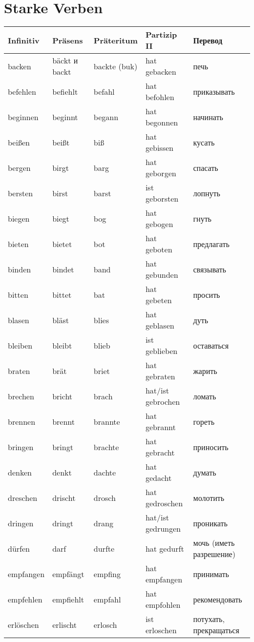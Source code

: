 \chapter{Starke Verben}

\begin{longtable}{|l|l|l|l|l|}
\hline
Infinitiv & Pr\"asens & Pr\"ateritum & Partizip II & Перевод \\
\hline\endhead
\hline\endfoot
backen & b\"ackt и backt & backte (buk) & hat gebacken & печь \\
befehlen & befiehlt & befahl & hat befohlen & приказывать \\
beginnen & beginnt & begann & hat begonnen & начинать \\
bei\ss en & bei\ss t & bi\ss  & hat gebissen & кусать \\
bergen & birgt & barg & hat geborgen & спасать \\
bersten & birst & barst & ist geborsten & лопнуть \\
biegen & biegt & bog & hat gebogen & гнуть \\
bieten & bietet & bot & hat geboten & предлагать \\
binden & bindet & band & hat gebunden & связывать \\
bitten & bittet & bat & hat gebeten & просить \\
blasen & bl\"ast & blies & hat geblasen & дуть \\
bleiben & bleibt & blieb & ist geblieben & оставаться  \\
braten & br\"at & briet & hat gebraten & жарить \\
brechen & bricht & brach & hat/ist gebrochen & ломать \\
brennen & brennt & brannte & hat gebrannt & гореть \\
bringen & bringt & brachte & hat gebracht & приносить  \\
denken & denkt & dachte & hat gedacht & думать \\
dreschen & drischt & drosch & hat gedroschen & молотить \\
dringen & dringt & drang & hat/ist gedrungen & проникать \\
d\"urfen & darf & durfte & hat gedurft & мочь (иметь разрешение) \\
empfangen & empf\"angt & empfing & hat empfangen & принимать \\
empfehlen & empfiehlt & empfahl & hat empfohlen & рекомендовать \\
erl\"oschen & erlischt & erlosch & ist erloschen & потухать, прекращаться \\

\end{longtable}
